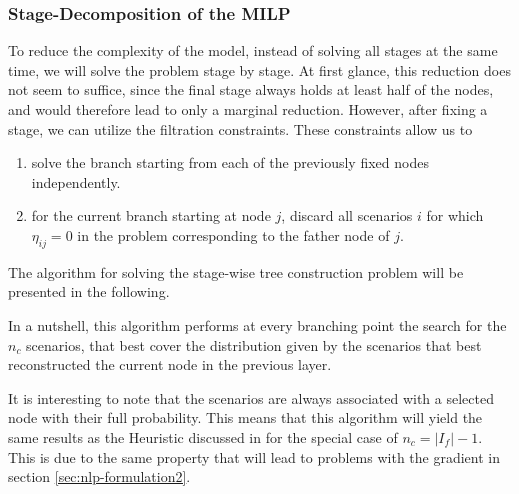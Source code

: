 \documentclass[a4paper, 12pt] {article}
\begin{document}
\subsubsection{Stage-Decomposition of the MILP}
To reduce the complexity of the model, instead of solving all stages at the same time, we will solve the problem stage by stage. At first glance, this reduction does not seem to suffice, since the final stage always holds at least half of the nodes, and would therefore lead to only a marginal reduction. However, after fixing a stage, we can utilize the filtration constraints. These constraints allow us to 
\begin{enumerate}
\item solve the branch starting from each of the previously fixed nodes independently.
\item for the current branch starting at node $j$, discard all scenarios $i$ for which $\eta_{ij}=0$ in the problem corresponding to the father node of $j$.
\end{enumerate}

The algorithm for solving the stage-wise tree construction problem will be presented in the following.
\begin{algorithm}
\end{algorithm}
In a nutshell, this algorithm performs at every branching point the search for the $n_c$ scenarios, that best cover the distribution given by the scenarios that best reconstructed the current node in the previous layer.

It is interesting to note that the scenarios are always associated with a selected node with their full probability. This means that this algorithm will yield the same results as the Heuristic discussed in \cite{Heitsch2010} for the special case of $n_c = |I_f|-1$. This is due to the same property that will lead to problems with the gradient in section \ref{sec:nlp-formulation2}.
\end{document}
